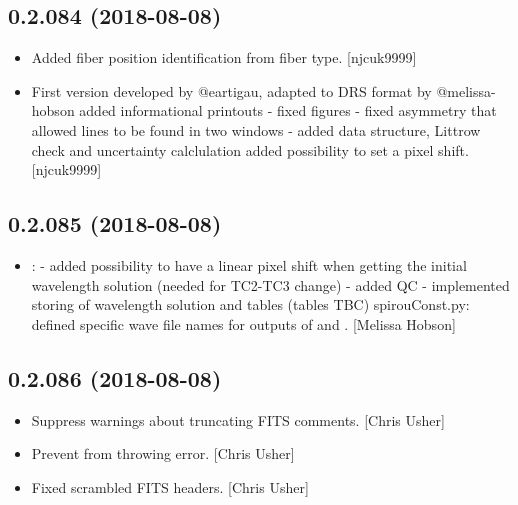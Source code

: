 \documentclass[a4paper,10pt,english]{report}
\begin{document}
\subsection{0.2.084 (2018-08-08)}
\label{\detokenize{misc/changelog:id377}}\begin{itemize}
\item {} 
Added fiber position identification from fiber type. {[}njcuk9999{]}

\item {} 
First version  developed by @eartigau, adapted to DRS format
by @melissa-hobson added informational printouts - fixed figures -
fixed asymmetry that allowed lines to be found in two windows - added
 data structure, Littrow check and uncertainty calclulation
added possibility to set a pixel shift. {[}njcuk9999{]}

\end{itemize}


\subsection{0.2.085 (2018-08-08)}
\label{\detokenize{misc/changelog:id378}}\begin{itemize}
\item {} 
: - added possibility to have a linear pixel
shift when getting the initial wavelength solution (needed for TC2-TC3
change) - added QC - implemented storing of wavelength solution and
tables (tables TBC) spirouConst.py: defined specific wave file names
for outputs of  and .
{[}Melissa Hobson{]}

\end{itemize}


\subsection{0.2.086 (2018-08-08)}
\label{\detokenize{misc/changelog:id379}}\begin{itemize}
\item {} 
Suppress warnings about truncating FITS comments. {[}Chris Usher{]}

\item {} 
Prevent  from throwing error. {[}Chris
Usher{]}

\item {} 
Fixed scrambled FITS headers. {[}Chris Usher{]}

\end{itemize}
\end{document}
